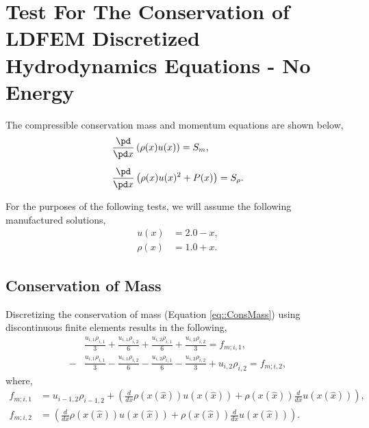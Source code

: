 \documentclass{article}
\newcommand{\x}{x(\hat{x})}
\begin{document}
\section{Test For The Conservation of LDFEM Discretized Hydrodynamics Equations - No Energy}
The compressible conservation mass and momentum equations are shown below,
\begin{align}
\label{eq::ConsMass}
&\frac{\pd}{\pd x}\left( \rho(x) u(x) \right) = S_m,\\[5pt]
\label{eq::ConsMomen}
&\frac{\pd}{\pd x}\left( \rho(x) u(x)^2 + P(x) \right) = S_\rho.
\end{align}

For the purposes of the following tests, we will assume the following manufactured solutions,
\begin{align}
\label{eq::MMS-Velocity}
u(x) &= 2.0 - x,\\[5pt]
\label{eq::MMS-Density}
\rho(x) &= 1.0 + x.
\end{align}

\subsection{Conservation of Mass}
Discretizing the conservation of mass (Equation \ref{eq::ConsMass}) using discontinuous finite elements results in the following,
\begin{align}
\label{eq::LDFEM-MassLHS-1}
&\frac{u_{i,1}\rho_{i,1}}{3} + \frac{u_{i,1}\rho_{i,2}}{6} + \frac{u_{i,2}\rho_{i,1}}{6} + \frac{u_{i,2}\rho_{i,2}}{3} = f_{m;i,1},\\[5pt]
\label{eq::LDFEM-MassLHS-2}
-&\frac{u_{i,1}\rho_{i,1}}{3} - \frac{u_{i,1}\rho_{i,2}}{6} - \frac{u_{i,2}\rho_{i,1}}{6} - \frac{u_{i,2}\rho_{i,2}}{3} + u_{i,2}\rho_{i,2} = f_{m;i,2},
\end{align}
where,
\begin{align}
\label{eq::LDFEM-MassRHS-1}
f_{m;i,1} &= u_{i-1,2}\rho_{i-1,2} + \left( \frac{d}{dx}\rho(\x) u(\x) + \rho(\x)\frac{d}{dx}u(\x) \right),\\[5pt]
\label{eq::LDFEM-MassRHS-2}
f_{m;i,2} &= \left( \frac{d}{dx}\rho(\x)u(\x) + \rho(\x)\frac{d}{dx}u(\x) \right).
\end{align}
\end{document}
